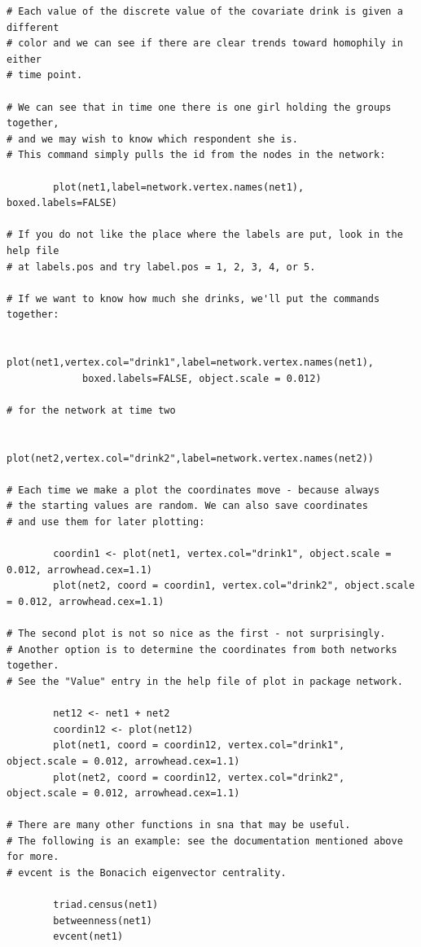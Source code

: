 \documentclass[a4paper,fleqn]{article}
\newcommand{\+}{\, + \,}
\begin{document}
{\begin{verbatim}
# Each value of the discrete value of the covariate drink is given a different
# color and we can see if there are clear trends toward homophily in either
# time point.

# We can see that in time one there is one girl holding the groups together,
# and we may wish to know which respondent she is.
# This command simply pulls the id from the nodes in the network:

        plot(net1,label=network.vertex.names(net1), boxed.labels=FALSE)

# If you do not like the place where the labels are put, look in the help file
# at labels.pos and try label.pos = 1, 2, 3, 4, or 5.

# If we want to know how much she drinks, we'll put the commands together:

        plot(net1,vertex.col="drink1",label=network.vertex.names(net1),
             boxed.labels=FALSE, object.scale = 0.012)

# for the network at time two

        plot(net2,vertex.col="drink2",label=network.vertex.names(net2))

# Each time we make a plot the coordinates move - because always
# the starting values are random. We can also save coordinates
# and use them for later plotting:

        coordin1 <- plot(net1, vertex.col="drink1", object.scale = 0.012, arrowhead.cex=1.1)
        plot(net2, coord = coordin1, vertex.col="drink2", object.scale = 0.012, arrowhead.cex=1.1)

# The second plot is not so nice as the first - not surprisingly.
# Another option is to determine the coordinates from both networks together.
# See the "Value" entry in the help file of plot in package network.

        net12 <- net1 + net2
        coordin12 <- plot(net12)
        plot(net1, coord = coordin12, vertex.col="drink1", object.scale = 0.012, arrowhead.cex=1.1)
        plot(net2, coord = coordin12, vertex.col="drink2", object.scale = 0.012, arrowhead.cex=1.1)

# There are many other functions in sna that may be useful.
# The following is an example: see the documentation mentioned above for more.
# evcent is the Bonacich eigenvector centrality.

        triad.census(net1)
        betweenness(net1)
        evcent(net1)
\end{verbatim}

}
\end{document}
